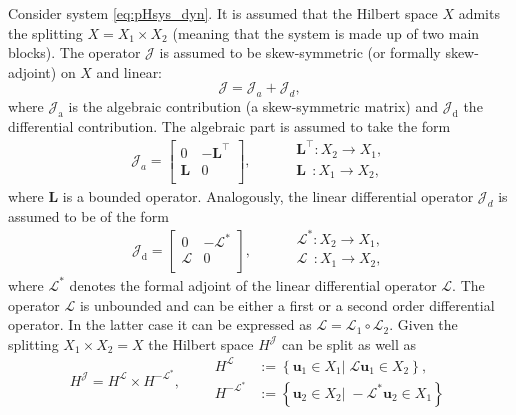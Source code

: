 \begin{assumption}\label{ass:linJ}
	Consider system \eqref{eq:pHsys_dyn}. It is assumed that the Hilbert space $X$ admits the splitting $X = X_1 \times X_2$ (meaning that the system is made up of two main blocks). The operator $\mathcal{J}$ is assumed to be skew-symmetric (or formally skew-adjoint) on $X$ and linear:
	\begin{equation}\label{eq:assJ}
	\mathcal{J} = \mathcal{J}_{{a}} + \mathcal{J}_{{d}},
	\end{equation}
	where $\mathcal{J}_{\text{a}}$ is the algebraic contribution (a skew-symmetric matrix) and $\mathcal{J}_{\text{d}}$ the differential contribution. The algebraic part is assumed to take the form
	\begin{equation}\label{eq:assJa}
		\mathcal{J}_{{a}} = \begin{bmatrix}
		0 & -\bm{L}^\top \\
		\bm{L} & 0 \\
		\end{bmatrix}, \qquad 
		\begin{aligned}
		&\bm{L}^\top : X_2 \rightarrow X_1, \\
		&\bm{L}\;\, : X_1 \rightarrow X_2, \\
		\end{aligned}
	\end{equation}
	where $\bm{L}$ is a bounded operator. 	Analogously, the linear differential operator $\mathcal{J}_{{d}}$ is assumed to be of the form
	\begin{equation}\label{eq:assJd}
	\mathcal{J}_{\text{d}} = 
	\begin{bmatrix}
	0 & -\mathcal{L}^* \\
	\mathcal{L} & 0 \\
	\end{bmatrix}, \qquad 
	\begin{aligned}
	&\mathcal{L}^* : X_2 \rightarrow X_1, \\
	&\mathcal{L}\;\, : X_1 \rightarrow X_2, \\
	\end{aligned}
	\end{equation}
	where $\mathcal{L}^*$ denotes the formal adjoint of the linear differential operator $\mathcal{L}$. 	The operator $\mathcal{L}$ is unbounded and  can be either a first or a second order differential operator. In the latter case it can be expressed as $\mathcal{L} = \mathcal{L}_1 \circ \mathcal{L}_2$. Given the splitting $X_1 \times X_2 = X$ the Hilbert space $H^\mathcal{J}$ can be split as well as 
	\begin{equation}
		H^\mathcal{J} = H^\mathcal{L} \times H^\mathcal{-L^*}, \qquad
		\begin{aligned}
		H^\mathcal{L} &:= \left\{\bm{u}_1 \in X_1 \vert \; \mathcal{L}\bm{u}_1 \in X_2 \right\}, \\
		H^\mathcal{-L^*} &:= \left\{\bm{u}_2 \in X_2 \vert \; -\mathcal{L}^*\bm{u}_2 \in X_1 \right\}
		\end{aligned}
	\end{equation}
\end{assumption}

